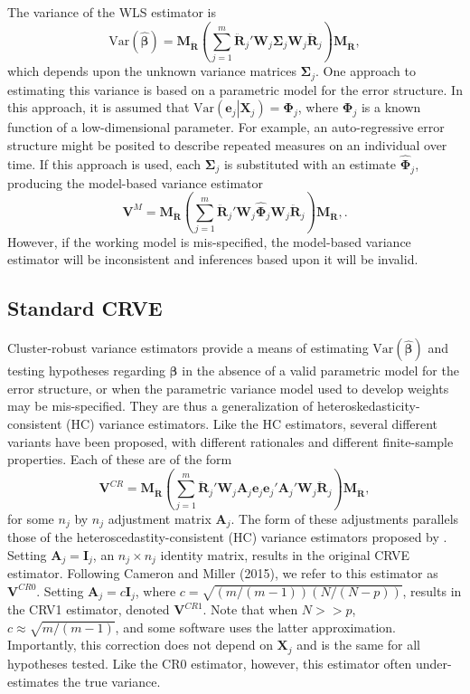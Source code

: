 \documentclass[12pt]{article}\usepackage[]{graphicx}\usepackage[]{color}
\newcommand{\Var}{\text{Var}}
\newcommand{\bm}{\mathbf}
\newcommand{\bs}{\boldsymbol}
\begin{document}
The variance of the WLS estimator is 
\begin{equation}
\label{eq:var_WLS}
\Var\left(\bs{\hat\beta}\right) = \bm{M_{\ddot{R}}}\left(\sum_{j=1}^m \bm{\ddot{R}}_j' \bm{W}_j \bs\Sigma_j \bm{W}_j\bm{\ddot{R}}_j\right) \bm{M_{\ddot{R}}},
\end{equation}
which depends upon the unknown variance matrices $\bm\Sigma_j$. 
One approach to estimating this variance is based on a parametric model for the error structure. 
In this approach, it is assumed that $\Var\left(\bm{e}_j\left|\bm{X}_j\right.\right) = \bs\Phi_j$, where $\bs\Phi_j$ is a known function of a low-dimensional parameter. 
For example, an auto-regressive error structure might be posited to describe repeated measures on an individual over time. 
If this approach is used, each $\bs\Sigma_j$ is substituted with an estimate $\bs{\hat\Phi}_j$, producing the model-based variance estimator
\begin{equation}
\label{eq:V_model}
\bm{V}^M = \bm{M_{\ddot{R}}}\left(\sum_{j=1}^m \bm{\ddot{R}}_j' \bm{W}_j \bs{\hat\Phi}_j \bm{W}_j\bm{\ddot{R}}_j\right) \bm{M_{\ddot{R}}},.
\end{equation}
However, if the working model is mis-specified, the model-based variance estimator will be inconsistent and inferences based upon it will be invalid.

\subsection{Standard CRVE}

Cluster-robust variance estimators provide a means of estimating $\Var\left(\bs{\hat\beta}\right)$ and testing hypotheses regarding $\bs\beta$ in the absence of a valid parametric model for the error structure, or when the parametric variance model used to develop weights may be mis-specified. 
They are thus a generalization of heteroskedasticity-consistent (HC) variance estimators. 
Like the HC estimators, several different variants have been proposed, with different rationales and different finite-sample properties. 
Each of these are of the form
\begin{equation}
\label{eq:V_small}
\bm{V}^{CR} = \bm{M_{\ddot{R}}}\left(\sum_{j=1}^m \bm{\ddot{R}}_j'\bm{W}_j \bm{A}_j \bm{e}_j \bm{e}_j' \bm{A}_j' \bm{W}_j \bm{\ddot{R}}_j\right) \bm{M_{\ddot{R}}},
\end{equation}
for some $n_j$ by $n_j$ adjustment matrix $\bm{A}_j$. 
The form of these adjustments parallels those of the heteroscedastity-consistent (HC) variance estimators proposed by \citet*{MacKinnon1985some}. 
Setting $\bm{A}_j = \bm{I}_j$, an $n_j \times n_j$ identity matrix, results in the original CRVE estimator. Following Cameron and Miller (2015), we refer to this estimator as $\bm{V}^{CR0}$. 
Setting $\bm{A}_j = c\bm{I}_j$, where $c = \sqrt{(m/(m-1))(N/(N - p))}$, results in the CRV1 estimator, denoted $\bm{V}^{CR1}$.
Note that when $N >> p$, $c \approx \sqrt{m/(m-1)}$, and some software uses the latter approximation. 
Importantly, this correction does not depend on $\bm{X}_j$ and is the same for all hypotheses tested. Like the CR0 estimator, however, this estimator often under-estimates the true variance.
\end{document}
